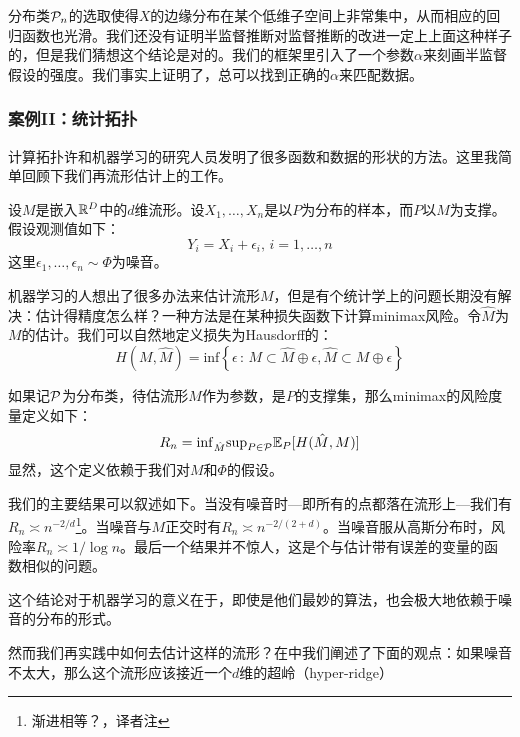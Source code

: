 \documentclass[]{article}
\begin{document}
分布类${\mathcal{P}}_n$的选取使得$X$的边缘分布在某个低维子空间上非常集中，从而相应的回归函数也光滑。我们还没有证明半监督推断对监督推断的改进一定上上面这种样子的，但是我们猜想这个结论是对的。我们的框架里引入了一个参数$\alpha$来刻画半监督假设的强度。我们事实上证明了，总可以找到正确的$\alpha$来匹配数据。

\subsubsection{案例II：统计拓扑}
计算拓扑许和机器学习的研究人员发明了很多函数和数据的形状的方法。这里我简单回顾下我们再流形估计上的工作\cite{wass2012a,wass2012b,wass2012c}。

设$M$是嵌入${\mathbb{R}}^D$中的$d$维流形。设$X_1,\ldots,X_n$是以$P$为分布的样本，而$P$以$M$为支撑。假设观测值如下：
$$  Y_i = X_i + \epsilon_i, \, i=1,\ldots,n $$
这里$\epsilon_1,\ldots,\epsilon_n \sim \Phi$为噪音。

机器学习的人想出了很多办法来估计流形$M$，但是有个统计学上的问题长期没有解决：估计得精度怎么样？一种方法是在某种损失函数下计算minimax风险。令$\hat{M}$为$M$的估计。我们可以自然地定义损失为Hausdorff的：
$$ H(M,\hat{M}) = \mathrm{inf} \left\{ \epsilon \, : \, M \subset \hat{M} \oplus \epsilon , \hat{M} \subset M \oplus \epsilon \right\} $$

如果记${\mathcal{P}}$为分布类，待估流形$M$作为参数，是$P$的支撑集，那么minimax的风险度量定义如下：
$$ R_n = \mathrm{inf}_{\hat{M}} \mathrm{sup}_{P \in {\mathcal{P}}} {\mathbb{E}}_P [ H(\hat{M}, M) ] $$
显然，这个定义依赖于我们对$M$和$\Phi$的假设。

我们的主要结果可以叙述如下。当没有噪音时---即所有的点都落在流形上---我们有$R_n \asymp n^{-2/d} $\footnote{渐进相等？，译者注}。当噪音与$M$正交时有$R_n \asymp n^{-2/(2+d)} $。当噪音服从高斯分布时，风险率$R_n \asymp 1/\log n$。最后一个结果并不惊人，这是个与估计带有误差的变量的函数相似的问题。

这个结论对于机器学习的意义在于，即使是他们最妙的算法，也会极大地依赖于噪音的分布的形式。

然而我们再实践中如何去估计这样的流形？在\cite{wass2012c}中我们阐述了下面的观点：如果噪音不太大，那么这个流形应该接近一个$d$维的超岭（hyper-ridge）






\end{document}
